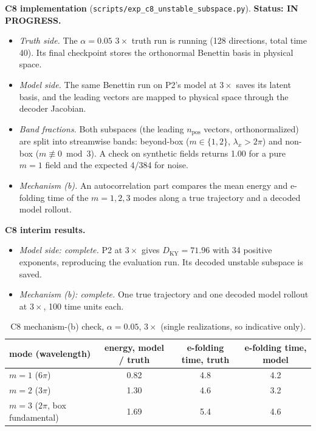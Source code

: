 \documentclass[11pt]{article}
\begin{document}
\textbf{C8 implementation} (\texttt{scripts/exp\_c8\_unstable\_subspace.py}).
\textbf{Status: IN PROGRESS.}
\begin{itemize}[leftmargin=*]
\item \emph{Truth side.} The $\alpha{=}0.05$ $3\times$ truth run is
  running (128 directions, total time 40). Its final checkpoint stores
  the orthonormal Benettin basis in physical space.
\item \emph{Model side.} The same Benettin run on P2's model at $3\times$
  saves its latent basis, and the leading vectors are mapped to physical
  space through the decoder Jacobian.
\item \emph{Band fractions.} Both subspaces (the leading $n_{\mathrm{pos}}$
  vectors, orthonormalized) are split into streamwise bands:
  beyond-box ($m\in\{1,2\}$, $\lambda_x>2\pi$) and non-box
  ($m\not\equiv0 \bmod 3$). A check on synthetic fields returns 1.00 for a
  pure $m{=}1$ field and the expected 4/384 for noise.
\item \emph{Mechanism (b).} An autocorrelation part compares the mean
  energy and e-folding time of the $m{=}1,2,3$ modes along a true
  trajectory and a decoded model rollout.
\end{itemize}

\textbf{C8 interim results.}
\begin{itemize}[leftmargin=*]
\item \emph{Model side: complete.} P2 at $3\times$ gives
  $D_{\mathrm{KY}}=71.96$ with 34 positive exponents, reproducing the
  evaluation run. Its decoded unstable subspace is saved.
\item \emph{Mechanism (b): complete.} One true trajectory and one decoded
  model rollout at $3\times$, 100 time units each.
\end{itemize}

\begin{table}[h]
\centering
\small
\begin{tabular}{lccc}
\toprule
mode (wavelength) & energy, model / truth & e-folding time, truth & e-folding time, model \\
\midrule
$m{=}1$ ($6\pi$) & 0.82 & 4.8 & 4.2 \\
$m{=}2$ ($3\pi$) & 1.30 & 4.6 & 3.2 \\
$m{=}3$ ($2\pi$, box fundamental) & 1.69 & 5.4 & 4.6 \\
\bottomrule
\end{tabular}
\caption{C8 mechanism-(b) check, $\alpha{=}0.05$, $3\times$ (single
realizations, so indicative only).}
\label{tab:c8_autocorr}
\end{table}
\end{document}
